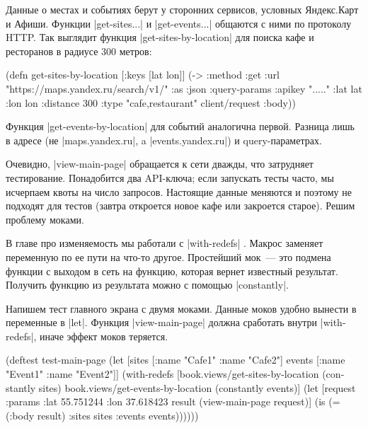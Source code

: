 Данные о местах и событиях берут у сторонних сервисов, условных Яндекс.Карт и
Афиши. Функции \spverb|get-sites...| и \spverb|get-events...| общаются с ними по
протоколу HTTP. Так выглядит функция \spverb|get-sites-by-location| для поиска
кафе и ресторанов в радиусе 300 метров:

\begin{english}
  \begin{clojure}
(defn get-sites-by-location
  [{:keys [lat lon]}]
  (-> {:method :get
       :url "https://maps.yandex.ru/search/v1/"
       :as :json
       :query-params {:apikey "....."
                      :lat lat :lon lon :distance 300
                      :type "cafe,restaurant"}}
      client/request
      :body))
  \end{clojure}
\end{english}

Функция \spverb|get-events-by-location| для событий аналогична первой. Разница
лишь в адресе (не \spverb|maps.yandex.ru|, a \spverb|events.yandex.ru|) и
query-параметрах.

Очевидно, \spverb|view-main-page| обращается к сети дважды, что затрудняет
тестирование. Понадобится два API-ключа; если запускать тесты часто, мы
исчерпаем квоты на число запросов. Настоящие данные меняются и поэтому не
подходят для тестов (завтра откроется новое кафе или закроется старое). Решим
проблему моками.

В главе про изменяемость мы работали с \spverb|with-redefs| .
Макрос заменяет переменную по ее пути на что-то другое. Простейший мок~---
это подмена функции с выходом в сеть на функцию, которая вернет известный результат.
Получить функцию из результата можно с помощью \spverb|constantly|.

Напишем тест главного экрана с двумя моками. Данные моков удобно вынести в
переменные в \spverb|let|. Функция \spverb|view-main-page| должна сработать
внутри \spverb|with-redefs|, иначе эффект моков теряется.

\begin{english}
  \begin{clojure}
(deftest test-main-page
  (let [sites [{:name "Cafe1"} {:name "Cafe2"}]
        events [{:name "Event1"} {:name "Event2"}]]
    (with-redefs
      [book.views/get-sites-by-location (constantly sites)
       book.views/get-events-by-location (constantly events)]
      (let [request {:params {:lat 55.751244
                              :lon 37.618423}}
            result (view-main-page request)]
        (is (= (:body result)
               {:sites sites :events events}))))))
  \end{clojure}
\end{english}

